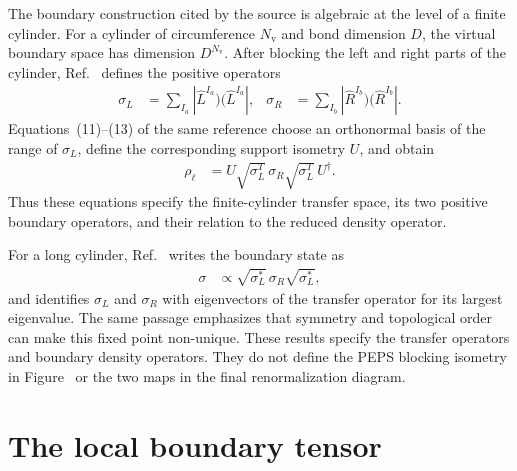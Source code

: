 \documentclass{article}
\begin{document}
The boundary construction cited by the source is algebraic at the level of a
finite cylinder. For a cylinder of circumference $N_{\mathrm v}$ and bond
dimension $D$, the virtual boundary space has dimension $D^{N_{\mathrm v}}$.
After blocking the left and right parts of the cylinder,
Ref.~\cite[Equation~(10)]
{Cirac2011Entanglement} defines the positive operators
\begin{align}
    \sigma_L
      &= \sum_{I_a}|\widehat L^{I_a})(\widehat L^{I_a}|,
    &
    \sigma_R
      &= \sum_{I_b}|\widehat R^{I_b})(\widehat R^{I_b}|.
    \label{eq:cpsv16_peps_boundary_rfp_specification_sigma_lr}
\end{align}
Equations~(11)--(13) of the same reference choose an orthonormal basis of the
range of $\sigma_L$, define the corresponding support isometry $U$, and obtain
\begin{align}
    \rho_\ell
      &= U\sqrt{\sigma_L^T}\,\sigma_R\sqrt{\sigma_L^T}\,U^\dagger.
    \label{eq:cpsv16_peps_boundary_rfp_specification_boundary_density}
\end{align}
Thus these equations specify the finite-cylinder transfer space, its two
positive boundary operators, and their relation to the reduced density
operator.

For a long cylinder, Ref.~\cite[Equation~(1) and the following paragraph]
{Schuch2013Topological} writes the boundary state as
\begin{align}
    \sigma
      &\mathrel{\propto}
      \sqrt{\sigma_L^*}\,\sigma_R\sqrt{\sigma_L^*},
    \label{eq:cpsv16_peps_boundary_rfp_specification_long_cylinder}
\end{align}
and identifies $\sigma_L$ and $\sigma_R$ with eigenvectors of the transfer
operator for its largest eigenvalue. The same passage emphasizes that symmetry
and topological order can make this fixed point non-unique. These results
specify the transfer operators and boundary density operators. They do not
define the PEPS blocking isometry in Figure~ or the two maps
in the final renormalization diagram.

\section{The local boundary tensor}
\end{document}
